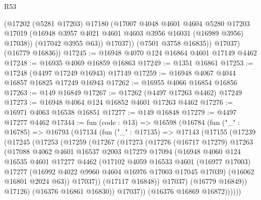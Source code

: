 \begin{lexlean}{R53}
\begin{coremodule}
              (@17202
                (@5281 @17203)
                @17180
                (@17007
                  @4048
                  @4601
                  @4604
                  @5280
                  @17203
                  @17019
                  (@16948 @3957 @4021 @4601 @4603 @3956 @16031 (@16989 @3956) @17038))
                (@17042 @3955 @63))
              @17037))
          (@7501 @3758 @16835))
        @17037)
      (@16779 @16836))
@17245 := @16948 @4070 @124 @16864 @4601 @17149 @4462
@17248 := @16935 @4069 @16859 @16863
@17249 := @1351 @16861
@17253 := @17248 (@4497 @17249 @16943) @17149
@17259 := @16948 @4067 @4044 @16857 @16825 @17249 @16943
@17262 := @16955 @4066 @16854 @16856
@17263 := @149 @16849
@17267 := @17262 (@4497 @17263 @4462) @17249
@17273 := @16948 @4064 @124 @16852 @4601 @17263 @4462
@17276 := @16971 @4063 @16538 @16851
@17277 := @149 @16848
@17279 := @4497 @17277 @4462
@17344 := fun (code : @13) =>
  @16598
    (@16784
      (fun ("_" : @16785) =>
      @16793
        (@17134
          (fun ("_" : @17135) =>
          @17143
            (@17155
              (@17239
                (@17245
                  (@17253
                    (@17259
                      (@17267
                        (@17273
                          (@17276
                            (@16717 @17279)
                            @17263
                            (@17088
                              @4062
                              @4601
                              @16537
                              @2003
                              @17279
                              @17094
                              (@16948
                                @4060
                                @124
                                @16535
                                @4601
                                @17277
                                @4462
                                (@17102
                                  @4059
                                  @16533
                                  @4601
                                  (@16977 @17003)
                                  @17277
                                  (@16992 @4022 @9960 @4604 @16976 @17003 @17045 @17039)
                                  (@16062 @16801 @2024 @63))
                                @17037))
                            (@17117 @16848))
                          @17037)
                        (@16779 @16849))
                      @17126)
                    (@16376 @16861 @16830))
                  @17037))
              (@16376 @16869 @16872))))))

\end{coremodule}
\end{lexlean}
